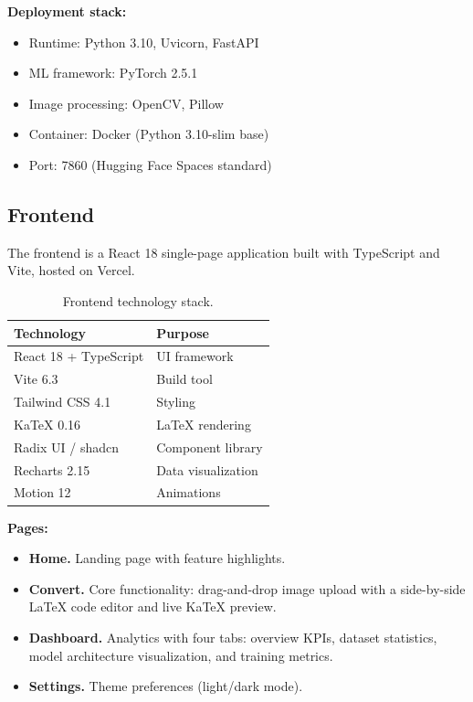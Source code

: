 \documentclass[11pt,a4paper]{article}
\begin{document}
\textbf{Deployment stack:}
\begin{itemize}[nosep]
  \item Runtime: Python 3.10, Uvicorn, FastAPI
  \item ML framework: PyTorch 2.5.1
  \item Image processing: OpenCV, Pillow
  \item Container: Docker (Python 3.10-slim base)
  \item Port: 7860 (Hugging Face Spaces standard)
\end{itemize}

\subsection{Frontend}

The frontend is a React 18 single-page application built with TypeScript and Vite, hosted on Vercel.

\begin{table}[H]
\centering
\caption{Frontend technology stack.}
\label{tab:frontend}
\begin{tabular}{ll}
\toprule
\textbf{Technology} & \textbf{Purpose} \\
\midrule
React 18 + TypeScript & UI framework \\
Vite 6.3              & Build tool \\
Tailwind CSS 4.1      & Styling \\
KaTeX 0.16            & \LaTeX{} rendering \\
Radix UI / shadcn     & Component library \\
Recharts 2.15         & Data visualization \\
Motion 12             & Animations \\
\bottomrule
\end{tabular}
\end{table}

\textbf{Pages:}
\begin{itemize}[nosep]
  \item \textbf{Home.} Landing page with feature highlights.
  \item \textbf{Convert.} Core functionality: drag-and-drop image upload with a side-by-side \LaTeX{} code editor and live KaTeX preview.
  \item \textbf{Dashboard.} Analytics with four tabs: overview KPIs, dataset statistics, model architecture visualization, and training metrics.
  \item \textbf{Settings.} Theme preferences (light/dark mode).
\end{itemize}
\end{document}

